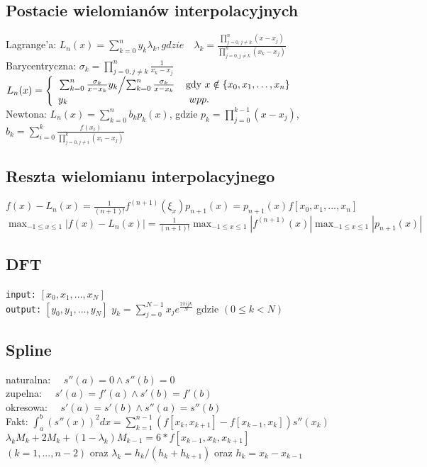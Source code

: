 \documentclass[a4paper,twocolumn]{article}
\begin{document}
\subsection{Postacie wielomianów interpolacyjnych}
Lagrange'a:  $L_n(x) =\sum_{k=0}^ny_k
\lambda_k ,gdzie\quad \lambda_k=\frac{\prod_{j=0, j\neq k}^{n}(x-x_j)}{\prod_{j=0, j\neq k}^{n}(x_k-x_j)}$\\
Barycentryczna:
$\sigma_k = \prod^n_{j=0, j\neq k}\frac{1}{x_k-x_j}$\\
$  L_n(x) = \left\{ \begin{array}{ll}
\left. \sum_{k=0}^n\frac{\sigma_k}{x-x_k}y_k \middle/ \sum_{k=0}^n\frac{\sigma_k}{x-x_k} \right. & \textrm{gdy $x \notin \left\{ x_0,x_1,\dots,x_n \right\} $}\\
y_k & \textrm{ $ wpp. $}
\end{array} \right.
$\\
Newtona: 
$ L_n(x) = \sum_{k=0}^n b_kp_k(x)$, gdzie $p_k = \prod_{j = 0}^{k-1} (x - x_j)$, \\
$b_k = \sum_{i = 0}^k \frac{f(x_i)}{\prod_{j = 0, j\neq i}^k (x_i - x_j)}$

\subsection{Reszta wielomianu interpolacyjnego}
$f(x)-L_n(x) = \frac{1}{(n+1)!}f^{(n+1)}(\xi_x)p_{n+1}(x) = p_{n+1}(x)f[x_0, x_1, ..., x_n]$\\
$\max_{-1\leq x \leq 1} | f(x)-L_n(x) | = \frac{1}{(n+1)!}\max_{-1\leq x \leq 1} | f^{(n+1)}(x) | \max_{-1\leq x \leq 1} | p_{n+1}(x) |$
\subsection{DFT}
\texttt{input:} $[x_0, x_1, ..., x_N]$\\
\texttt{output:} $[y_0, y_1, ..., y_N]$
$y_k = \sum_{j = 0}^{N-1} x_j e^{\frac{2 \pi i j k}{N}} $ gdzie $ (0 \leqslant k < N)$
\subsection{Spline}
naturalna: $\quad s''(a)=0 \land s''(b)=0$\\
zupelna: $\quad s'(a)=f'(a) \land s'(b)=f'(b)$\\
okresowa: $\quad s'(a)=s'(b) \land s''(a)=s''(b)$\\
Fakt: $\int_a^b \left(s''(x)\right)^2 dx = \sum_{k=1}^{n-1} \left( f\left[x_k,x_{k+1}\right] - f\left[x_{k-1},x_k\right]\right)s''(x_k) $\\
$\lambda_{k}M_{k}+2M_{k}+(1-\lambda_{k})M_{k-1}=6*f[x_{k-1},x_{k},x_{k+1}]$\\ $(k=1,...,n-2)$ oraz $\lambda_{k} = h_{k}/(h_{k}+h_{k+1})$ oraz $h_{k}=x_{k} - x_{k-1}$
\end{document}
